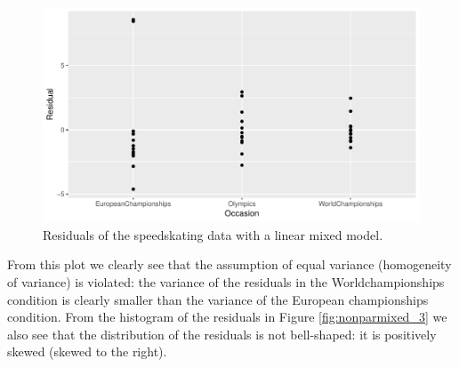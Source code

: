 \documentclass[]{report}\usepackage[]{graphicx}\usepackage[]{color}
\makeatletter
\def\maxwidth{ %
  \ifdim\Gin@nat@width>\linewidth
    \linewidth
  \else
    \Gin@nat@width
  \fi
}
\newenvironment{knitrout}{}{} %
\makeatother
\begin{document}
\begin{knitrout}
\color{fgcolor}\begin{figure}

{\centering \includegraphics[width=\maxwidth]{figure/nonparmixed_2-1} 

}

\caption[Residuals of the speedskating data with a linear mixed model]{Residuals of the speedskating data with a linear mixed model.}\label{fig:nonparmixed_2}
\end{figure}


\end{knitrout}

From this plot we clearly see that the assumption of equal variance (homogeneity of variance) is violated: the variance of the residuals in the Worldchampionships condition is clearly smaller than the variance of the European championships condition. From the histogram of the residuals in Figure \ref{fig:nonparmixed_3} we also see that the distribution of the residuals is not bell-shaped: it is positively skewed (skewed to the right).
\end{document}
